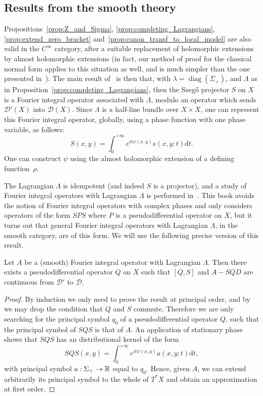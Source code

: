 \documentclass[AHL,Unicode,longabstracts,published]{cedram}
\DeclareMathOperator{\diag}{diag}
\newcommand{\clD}{\mathcal{D}}
\newcommand\1{\mathds{1}}
\newcommand{\R}{\mathbb{R}}
\newcommand{\dd}{\mathrm{d}}
\renewcommand*{\to}{\mathchoice{\longrightarrow}{\rightarrow}{\rightarrow}{\rightarrow}}
\begin{document}
\subsection{Results from the smooth theory}\label{sec:results-from-smooth}

Propositions~\ref{prop:Z_and_Sigma}, \ref{prop:completing_Lagrangians}, \ref{prop:extend_zero_bracket} and~\ref{prop:canon_transf_to_local_model} are also valid in the $C^{\infty}$ category, after a suitable replacement of holomorphic extensions by almost holomorphic extensions (in fact, our method of proof for the classical normal form applies to this situation as well, and is much simpler than the one presented in~\cite[Appendix~2]{boutet_de_monvel_hypoelliptic_1974}). The main result of~\cite{boutet_de_monvel_sur_1975} is then that, with $\lambda=\diag(\Sigma_+)$, and $\Lambda$ as in Proposition~\ref{prop:completing_Lagrangians}, then the Szeg\H{o} projector $S$ on $X$ is a {Fourier integral} operator associated with $\Lambda$, modulo an operator which sends $\clD'(X)$ into $\clD(X)$. Since $\Lambda$ is a half-line bundle over $X\times X$, one can represent this {Fourier integral} operator, globally, using a phase function with one phase variable, as follows:
\[
S(x,y)=\int_0^{+\infty}e^{it\psi(x,y)}s(x,y;t)\dd t.
\]
One can construct $\psi$ using the almost holomorphic extension of a defining function~$\rho$.

The {Lagrangian} $\Lambda$ is idempotent (and indeed $S$ is a projector), and a study of {Fourier integral operators} with {Lagrangian} $\Lambda$ is performed in~\cite{boutet_de_monvel_spectral_1981}. This book avoids the notion of {Fourier integral} operators with complex phases and only considers operators of the form $\mathit{SPS}$ where $P$ is a pseudodifferential operator on $X$, but it turns out that general {Fourier integral operators} with Lagrangian $\Lambda$, in the smooth category, are of this form. We will use the following precise version of this result.

\begin{prop}\label{prop:repr_BG_smooth}
Let $A$ be a (smooth) {Fourier integral} operator with {Lagrangian} $\Lambda$. Then there exists a pseudodifferential operator $Q$ on $X$ such that $[Q,S]$ and $A-SQD$ are continuous from $\clD'$ to $\clD$.
\end{prop}

\begin{proof}
By induction we only need to prove the result at principal order, and by~\cite[Proposition~2.13]{boutet_de_monvel_spectral_1981} we may drop the condition that $Q$ and $S$ commute. Therefore we are only searching for the principal symbol $q_0$ of a pseudodifferential operator $Q$, such that the principal symbol of $\mathit{SQS}$ is that of $A$. An application of stationary phase shows that $\mathit{SQS}$ has an distributional kernel of the form
\[
\mathit{SQS}(x,y)=\int_0^{+\infty}e^{it\psi(x,y)}a(x,y;t)\dd t,
\]
with principal symbol $a:\Sigma_+\to \R$ equal to $q_0$. Hence, given $A$, we can extend arbitrarily its principal symbol to the whole of $T^*X$ and obtain an approximation at first order.
\end{proof}
\end{document}
